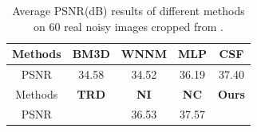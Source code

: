\documentclass[10pt,twocolumn,letterpaper]{article}
\begin{document}
\begin{table}
\caption{Average PSNR(dB) results of different methods on 60 real noisy images cropped from \cite{crosschannel2016}.}
\vspace{-1mm}
\label{tab3}
\begin{center}
\renewcommand\arraystretch{1}
\begin{tabular}{|c||c|c|c|c|}
\hline
 Methods& \textbf{BM3D}&\textbf{WNNM}&\textbf{MLP}&\textbf{CSF}
\\
\hline
PSNR &   34.58 & 34.52 & 36.19 & 37.40
\\
\hline
Methods& \textbf{TRD}& \textbf{NI}& \textbf{NC} &\textbf{Ours} 
\\
\hline
PSNR &  {\color{blue}{37.75}} & 36.53 & 37.57  & {\color{red}{ 38.75}}
\\
\hline
\end{tabular}
\end{center}\vspace{-8mm}
\end{table}
\end{document}
